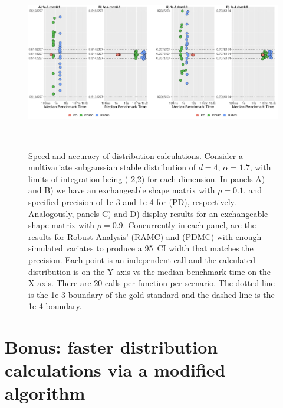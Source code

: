 \begin{figure}[!h]
  \centering
  \includegraphics[height=3in, width=5.5in]{screen_shot_both.png}
  \caption{Speed and accuracy of distribution calculations.  Consider
    a multivariate subgaussian stable distribution of $d=4$,
    $\alpha=1.7$, with limits of integration being (-2,2) for each
    dimension.  In panels A) and B) we have an exchangeable shape
    matrix with $\rho=0.1$, and specified precision of 1e-3 and 1e-4
    for  (PD), respectively.  Analogously, panels
    C) and D) display results for an exchangeable shape matrix with
    $\rho=0.9$.  Concurrently in each panel, are the results for Robust
    Analysis'  (RAMC) and 
    (PDMC) with enough simulated variates to produce a 95\ CI width
    that matches the precision. Each point is an independent call and
    the calculated distribution is on the Y-axis vs the median
    benchmark time on the X-axis. There are 20 calls per
    function per scenario. The dotted line is the 1e-3 boundary of the
    gold standard and the dashed line is the 1e-4 boundary. }
  \label{fig:speedacc1}
\end{figure}



\section{Bonus:  faster distribution calculations via a modified
   algorithm}



